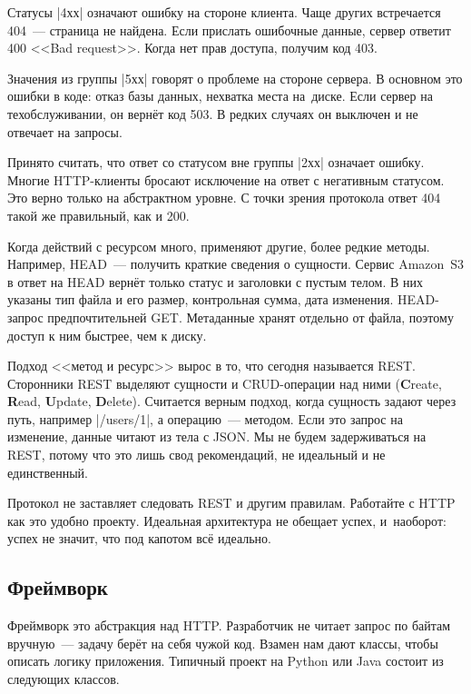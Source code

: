 Статусы \spverb|4хх| означают ошибку на стороне клиента. Чаще других встречается
404~--- страница не найдена. Если прислать ошибочные данные, сервер ответит 400
<<Bad request>>. Когда нет прав доступа, получим код 403.

Значения из группы \spverb|5хх| говорят о проблеме на стороне сервера. В
основном это ошибки в коде: отказ базы данных, нехватка места на~диске. Если
сервер на техобслуживании, он верн\"{е}т код 503. В редких случаях он выключен и
не отвечает на запросы.

Принято считать, что ответ со статусом вне группы \spverb|2хх| означает
ошибку. Многие HTTP-клиенты бросают исключение на ответ с негативным статусом.
Это верно только на абстрактном уровне. С точки зрения протокола ответ 404 такой
же правильный, как и 200.


Когда действий с ресурсом много, применяют другие, более редкие
методы. Например, HEAD~--- получить краткие сведения о сущности. Сервис
Amazon~S3 в ответ на HEAD верн\"{е}т только статус и заголовки с пустым телом. В
них указаны тип файла и его размер, контрольная сумма, дата
изменения. HEAD-запрос предпочтительней GET. Метаданные хранят отдельно от
файла, поэтому доступ к ним быстрее, чем к диску.


Подход <<метод и ресурс>> вырос в то, что сегодня называется
REST. Сторонники REST выделяют сущности и
CRUD-операции над ними (\textbf{C}reate, \textbf{R}ead, \textbf{U}pdate,
\textbf{D}elete). Считается верным подход, когда сущность задают через путь,
например \spverb|/users/1|, а операцию~--- методом. Если это запрос на
изменение, данные читают из тела с JSON. Мы не будем задерживаться на REST,
потому что это лишь свод рекомендаций, не идеальный и не единственный.


Протокол не заставляет следовать REST и другим правилам. Работайте с HTTP как
это удобно проекту. Идеальная архитектура не обещает успех, и~наоборот: успех не
значит, что под капотом вс\"{е} идеально.

\subsection{Фреймворк}


Фреймворк это абстракция над HTTP. Разработчик не читает запрос по байтам
вручную~--- задачу бер\"{е}т на себя чужой код. Взамен нам дают классы, чтобы
описать логику приложения. Типичный проект на Python или Java состоит из
следующих классов.

